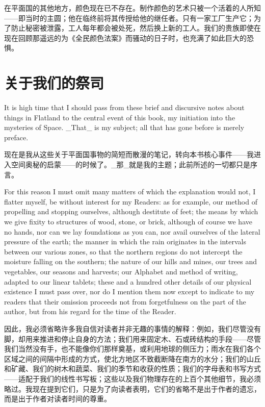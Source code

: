 \documentclass[12pt,UTF8]{ctexbook}
\begin{document}
在平面国的其他地方，颜色现在已不存在。制作颜色的艺术只被一个活着的人所知——即当时的主圆；他在临终前将其传授给他的继任者。只有一家工厂生产它；为了防止秘密被泄露，工人每年都会被处死，然后换上新的工人。我们的贵族即使在现在回顾那遥远的为《全民颜色法案》而骚动的日子时，也充满了如此巨大的恐惧。

\chapter{关于我们的祭司}

It is high time that I should pass from these brief and discursive notes about things in Flatland to the central event of this book, my initiation into the mysteries of Space. \_That\_ is my subject; all that has gone before is merely preface.

现在是我从这些关于平面国事物的简短而散漫的笔记，转向本书核心事件——我进入空间奥秘的启蒙——的时候了。\_那\_就是我的主题；此前所述的一切都只是序言。

For this reason I must omit many matters of which the explanation would not, I flatter myself, be without interest for my Readers: as for example, our method of propelling and stopping ourselves, although destitute of feet; the means by which we give fixity to structures of wood, stone, or brick, although of course we have no hands, nor can we lay foundations as you can, nor avail ourselves of the lateral pressure of the earth; the manner in which the rain originates in the intervals between our various zones, so that the northern regions do not intercept the moisture falling on the southern; the nature of our hills and mines, our trees and vegetables, our seasons and harvests; our Alphabet and method of writing, adapted to our linear tablets; these and a hundred other details of our physical existence I must pass over, nor do I mention them now except to indicate to my readers that their omission proceeds not from forgetfulness on the part of the author, but from his regard for the time of the Reader.

因此，我必须省略许多我自信对读者并非无趣的事情的解释：例如，我们尽管没有脚，却用来推进和停止自身的方法；我们用来固定木、石或砖结构的手段——尽管我们当然没有手，也不能像你们那样奠基，或利用地球的侧压力；雨水在我们各个区域之间的间隔中形成的方式，使北方地区不致截断降在南方的水分；我们的山丘和矿藏、我们的树木和蔬菜、我们的季节和收获的性质；我们的字母表和书写方式——适配于我们的线性书写板；这些以及我们物理存在的上百个其他细节，我必须略过。我现在提到它们，只是为了向读者表明，它们的省略不是出于作者的遗忘，而是出于作者对读者时间的尊重。
\end{document}
